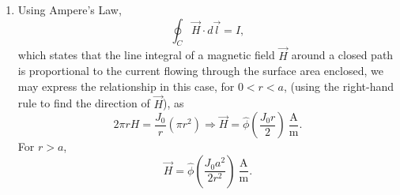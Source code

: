 \documentclass{article}
\begin{document}
\begin{enumerate}
		In this case, the magnetic flux density of the two current carrying wires being considered is
		\begin{align*}
			&\vec{B}_1 = \hat{\phi}\frac{\mu_0(10^{\mathrm{A}})}{2\pi(\sqrt{8})}^{\mathrm{T}} \\
			&\vec{B}_2 = -\hat{\phi}\frac{\mu_0(10^{\mathrm{A}})}{2\pi(\sqrt{8})}^{\mathrm{T}}.
		\end{align*}
		Deriving force on the third wire as in the previous example, 
		\[
			\vec{F_3} = I \int_L d \vec{l} \times \vec{B} = 10^{\mathrm{A}} \int_L d \hat{z} \times (\vec{B_1} + \vec{B_2}).
		\]	
		Converting the magnetic flux densities to Cartesian coordinates, 
		\begin{align*}
			&\vec{B}_1 = [-\hat{x}(5\times 10^{-7}) + \hat{y}(5 \times 10^{-7})]\\
			&\vec{B}_2 = [\hat{x}(-5\times 10^{-7}) - \hat{y}(5 \times 10^{-7})]\\
		\end{align*}
		so that 
		\[
			\vec{F_3} = 10^{\mathrm{A}}\int_L d \vec{z} \times \hat{x}(10^{-6}) = \hat{y}(10)^{\micro\mathrm{N}}
		\]
		\item
			Using Ampere's Law,
			\[
			  \oint_C \vec{H} \cdot d \vec{l} = I,
			\]
			which states that the line integral of a magnetic field \(\vec{H}\) around a closed path is proportional to the current flowing through the surface area enclosed, we may express the relationship in this case, for \(0 < r < a\), (using the right-hand rule to find the direction of \(\vec{H}\)), as
			\[
				2\pi r H = \frac{J_0}{r}(\pi r^2) \Rightarrow \vec{H} = \hat{\phi}(\frac{J_0 r}{2}) \ \mathrm{\frac{A}{m}}.
			\]
			For \(r > a\),
			\[
				\vec{H} = \hat{\phi}(\frac{J_0a^2}{2r^2}) \ \mathrm{\frac{A}{m}}.
			\]
\end{enumerate}
\end{document}
